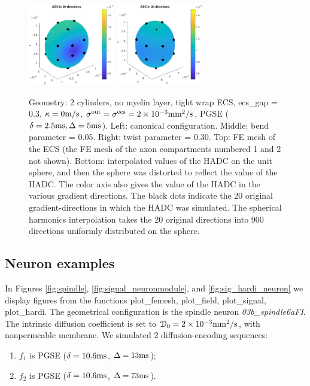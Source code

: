 \documentclass[a4paper]{article}
\begin{document}
\begin{figure}[!ht]
    \includegraphics[width=0.3358\textwidth]{adc_alldir/bend.pdf}
    \includegraphics[width=0.3368\textwidth]{adc_alldir/twist.pdf}
    \caption{Geometry: 2 cylinders, no myelin layer, tight wrap ECS, ecs\_gap = 0.3, $\kappa=0\mathrm{m/s}$, $\sigma^\text{out}=\sigma^\text{ecs}=2\times10^{-3}\mathrm{mm^2/s}$, PGSE ($\delta=2.5\mathrm{ms},\Delta=5\mathrm{ms}$). Left: canonical configuration. Middle: bend parameter = 0.05. Right: twist parameter = 0.30. Top: FE mesh of the ECS (the FE mesh of the axon compartments numbered 1 and 2 not shown). Bottom: interpolated values of the HADC on the unit sphere, and then the sphere was distorted to reflect the value of the HADC. The color axis also gives the value of the HADC in the various gradient directions. The black dots indicate the 20 original gradient-directions in which the HADC was simulated. The spherical harmonics interpolation takes the 20 original directions into 900 directions uniformly distributed on the sphere.}
    \label{fig:bend_twist}
\end{figure}




\subsection{Neuron examples}

In Figures \ref{fig:spindle}, \ref{fig:signal_neuronmodule}, and \ref{fig:sig_hardi_neuron} we display figures from the functions plot\_femesh, plot\_field, plot\_signal, plot\_hardi. The geometrical configuration is the spindle neuron {\it 03b\_spindle6aFI}. The intrinsic diffusion coefficient is set to $\mathcal{D}_0 = 2\times 10^{-3} \mathrm{mm^2/s}$, with nonpermeable membrane. We simulated 2 diffusion-encoding sequences:
\begin{enumerate}
    \item $f_1$ is PGSE ($\delta=10.6\mathrm{ms}$, $\Delta=13\mathrm{ms}$);
    \item $f_2$ is PGSE ($\delta=10.6\mathrm{ms}$, $\Delta=73\mathrm{ms}$).
\end{enumerate}
\end{document}
